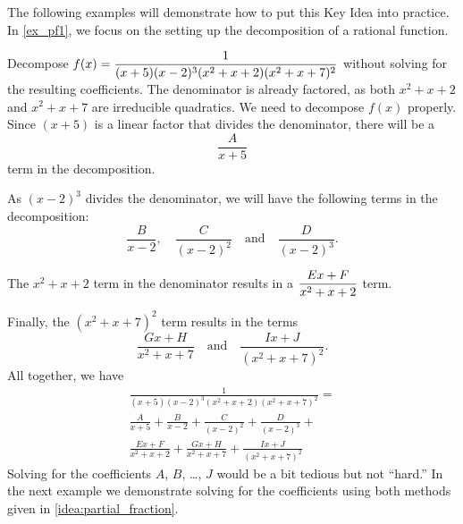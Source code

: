 
The following examples will demonstrate how to put this Key Idea into practice. In \autoref{ex_pf1}, we focus on the setting up the decomposition of a rational function.

\begin{example}\label{ex_pf1}%
Decompose $\displaystyle f(x)=\frac{1}{(x+5)(x-2)^3(x^2+x+2)(x^2+x+7)^2}$ without solving for the resulting coefficients.
\solution
The denominator is already factored, as both $x^2+x+2$ and $x^2+x+7$ are irreducible quadratics. We need to decompose $f(x)$ properly. Since $(x+5)$ is a linear factor that divides the denominator, there will be a
\[\frac{A}{x+5}\]
term in the decomposition.

As $(x-2)^3$ divides the denominator, we will have the following terms in the decomposition:
\[\frac{B}{x-2},\quad \frac{C}{(x-2)^2}\quad \text{and}\quad \frac{D}{(x-2)^3}.\]

The $x^2+x+2$ term in the denominator results in a $\displaystyle\frac{Ex+F}{x^2+x+2}$ term.

Finally, the $(x^2+x+7)^2$ term results in the terms
\[\frac{Gx+H}{x^2+x+7}\quad \text{and}\quad \frac{Ix+J}{(x^2+x+7)^2}.\]
All together, we have
\begin{multline*}
	\frac{1}{(x+5)(x-2)^3(x^2+x+2)(x^2+x+7)^2}= \\
	\frac{A}{x+5} + \frac{B}{x-2}+ \frac{C}{(x-2)^2}+\frac{D}{(x-2)^3}+\\
	\frac{Ex+F}{x^2+x+2}+\frac{Gx+H}{x^2+x+7}+\frac{Ix+J}{(x^2+x+7)^2}
\end{multline*}
Solving for the coefficients $A$, $B$, \dots, $J$ would be a bit tedious but not ``hard.''  In the next example we demonstrate solving for the coefficients using both methods given in \autoref{idea:partial_fraction}.
\end{example}


